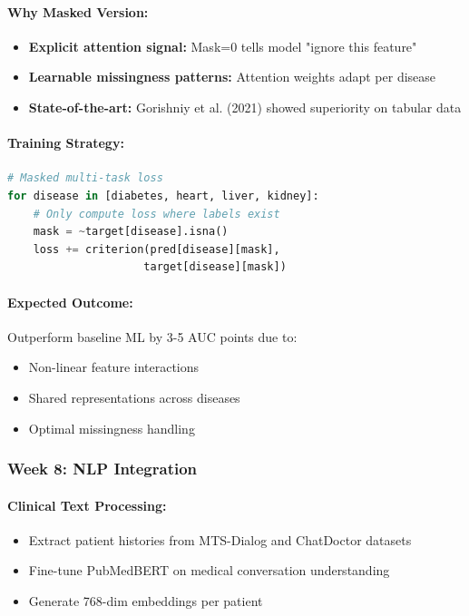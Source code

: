 \documentclass[12pt,a4paper]{article}
\begin{document}
\paragraph{Why Masked Version:}
\begin{itemize}
    \item \textbf{Explicit attention signal:} Mask=0 tells model "ignore this feature"
    \item \textbf{Learnable missingness patterns:} Attention weights adapt per disease
    \item \textbf{State-of-the-art:} Gorishniy et al. (2021) showed superiority on tabular data
\end{itemize}

\paragraph{Training Strategy:}
\begin{lstlisting}[language=Python]
# Masked multi-task loss
for disease in [diabetes, heart, liver, kidney]:
    # Only compute loss where labels exist
    mask = ~target[disease].isna()
    loss += criterion(pred[disease][mask], 
                     target[disease][mask])
\end{lstlisting}

\paragraph{Expected Outcome:}
Outperform baseline ML by 3-5 AUC points due to:
\begin{itemize}
    \item Non-linear feature interactions
    \item Shared representations across diseases
    \item Optimal missingness handling
\end{itemize}

\subsubsection{Week 8: NLP Integration}

\paragraph{Clinical Text Processing:}
\begin{itemize}
    \item Extract patient histories from MTS-Dialog and ChatDoctor datasets
    \item Fine-tune PubMedBERT on medical conversation understanding
    \item Generate 768-dim embeddings per patient
\end{itemize}
\end{document}
